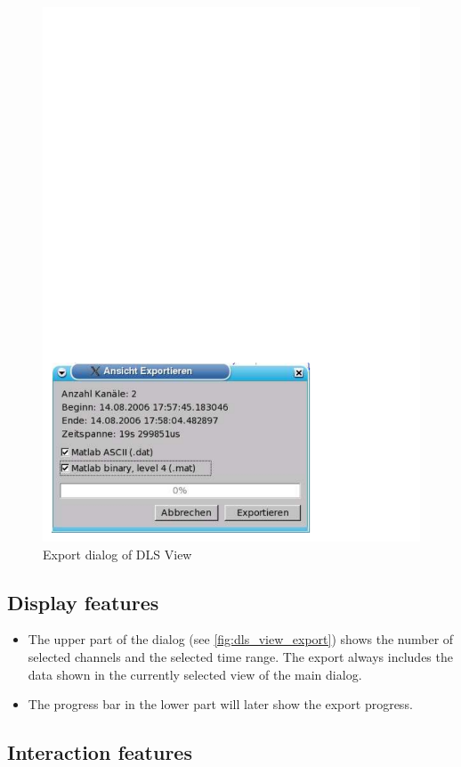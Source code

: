 \documentclass[a4paper,12pt,BCOR6mm,bibtotoc,idxtotoc]{scrbook}
\begin{document}
\begin{figure}[tbh] \begin{center} \includegraphics[width=.6\textwidth]{bilder/view_export} \end{center} \caption{Export dialog of DLS View} \label{fig:dls_view_export} \end{figure}


\subsection{Display features}

\begin{itemize}

\item The upper part of the dialog (see \autoref{fig:dls_view_export}) shows
the number of selected channels and the selected time range. The export always
includes the data shown in the currently selected view of the main dialog.

\item The progress bar in the lower part will later show the export progress.

\end{itemize}


\subsection{Interaction features}
\end{document}
